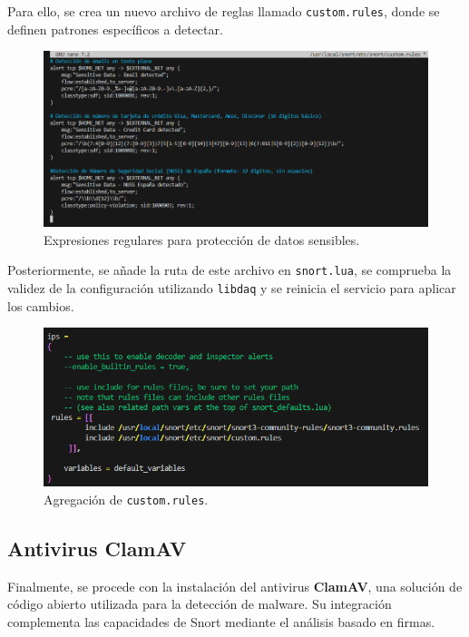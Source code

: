 \documentclass[11pt,a4paper,twoside]{report}
\begin{document}
Para ello, se crea un nuevo archivo de reglas llamado \texttt{custom.rules}, donde se definen patrones específicos a detectar.

\begin{figure}[H]
	\centering
	\includegraphics[scale=0.6]{sensitive/1.png}
	\caption{Expresiones regulares para protección de datos sensibles.}
\end{figure}

Posteriormente, se añade la ruta de este archivo en \texttt{snort.lua}, se comprueba la validez de la configuración utilizando \texttt{libdaq} y se reinicia el servicio para aplicar los cambios.

\begin{figure}[H]
	\centering
	\includegraphics[scale=0.6]{sensitive/2.png}
	\caption{Agregación de \texttt{custom.rules}.}
\end{figure}

\pagebreak

\subsection{Antivirus ClamAV}

Finalmente, se procede con la instalación del antivirus \textbf{ClamAV}, una solución de código abierto utilizada para la detección de malware. Su integración complementa las capacidades de Snort mediante el análisis basado en firmas.
\end{document}
